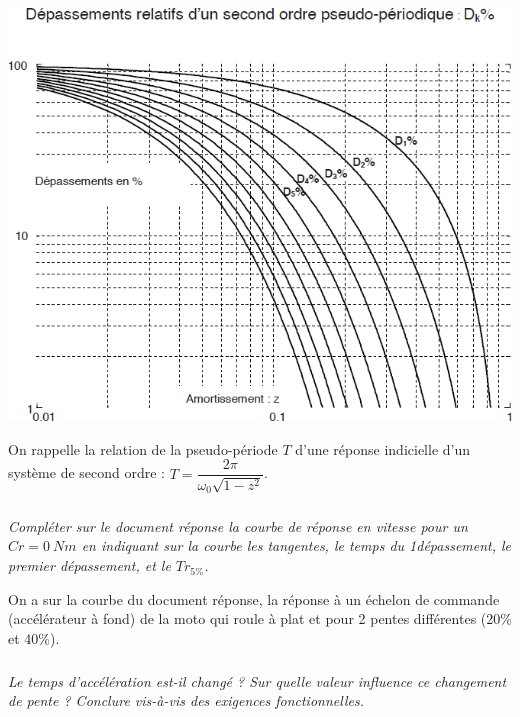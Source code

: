 \documentclass[10pt,fleqn]{article} %
\begin{document}
\begin{multicols}{2}
\begin{center}
\includegraphics[width=\linewidth]{images/fig_08}
\end{center}


\vspace{.25cm}

On rappelle la relation de la pseudo-période $T$ d’une réponse indicielle d’un système de second ordre : $T=\dfrac{2\pi}{\omega_0 \sqrt{1-z^2}}$.


\subparagraph{}
\textit{Compléter sur le document réponse la courbe de réponse en vitesse pour un $Cr=\SI{0}{Nm}$ en indiquant sur la courbe les tangentes, le temps du 1\ier dépassement, le premier dépassement, et le $Tr_{5\%}$.}

\ifprof
\begin{corrige}
\end{corrige}
\else
\fi


On a sur la courbe du document réponse, la réponse à un échelon de commande (accélérateur à fond) de la moto qui roule à plat et pour 2 pentes différentes (20\% et 40\%).

\subparagraph{}
\textit{Le temps d’accélération est-il changé ? Sur quelle valeur influence ce changement de pente ? Conclure vis-à-vis des exigences fonctionnelles.}
\ifprof
\begin{corrige}
\end{corrige}
\else
\fi

\end{multicols}
%
%
%
%
%
\end{document}
